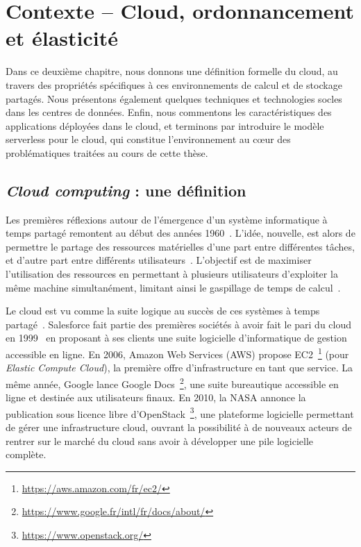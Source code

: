\clearemptydoublepage
\chapter{Contexte -- Cloud, ordonnancement et élasticité}
\label{chapter:context}

Dans ce deuxième chapitre, nous donnons une définition formelle du cloud, au travers des propriétés spécifiques à ces environnements de calcul et de stockage partagés. Nous présentons également quelques techniques et technologies socles dans les centres de données. Enfin, nous commentons les caractéristiques des applications déployées dans le cloud, et terminons par introduire le modèle serverless pour le cloud, qui constitue l'environnement au cœur des problématiques traitées au cours de cette thèse.

\section{\textit{Cloud computing} : une définition}

Les premières réflexions autour de l'émergence d'un système informatique à temps partagé remontent au début des années 1960~\cite{greenberger1962management}. L'idée, nouvelle, est alors de permettre le partage des ressources matérielles d'une part entre différentes tâches, et d'autre part entre différents utilisateurs~\cite{meyerVirtualMachineTimesharing1970}. L'objectif est de maximiser l'utilisation des ressources en permettant à plusieurs utilisateurs d'exploiter la même machine simultanément, limitant ainsi le gaspillage de temps de calcul~\cite{corbato1962experimental}.

Le cloud est vu comme la suite logique au succès de ces systèmes à temps partagé~\cite{hayesCloudComputing2008}. Salesforce fait partie des premières sociétés à avoir fait le pari du cloud en 1999~\cite{weissmanDesignForceCom2009} en proposant à ses clients une suite logicielle d'informatique de gestion accessible en ligne. En 2006, Amazon Web Services (\gls{AWS}) propose EC2~\footnote{\href{https://aws.amazon.com/fr/ec2/}{https://aws.amazon.com/fr/ec2/}} (pour \textit{Elastic Compute Cloud}), la première offre d'infrastructure en tant que service. La même année, Google lance Google Docs~\footnote{\href{https://www.google.fr/intl/fr/docs/about/}{https://www.google.fr/intl/fr/docs/about/}}, une suite bureautique accessible en ligne et destinée aux utilisateurs finaux. En 2010, la NASA annonce la publication sous licence libre d'OpenStack~\footnote{\href{https://www.openstack.org/}{https://www.openstack.org/}}, une plateforme logicielle permettant de gérer une infrastructure cloud, ouvrant la possibilité à de nouveaux acteurs de rentrer sur le marché du cloud sans avoir à développer une pile logicielle complète.

